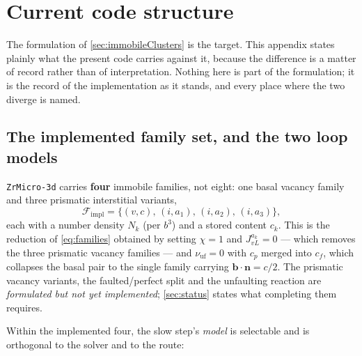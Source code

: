 \documentclass{article}
\newcommand{\ZrM}{\texttt{ZrMicro-3d}}
\newcommand{\bvec}{\bm b}
\newcommand{\nvec}{\bm n}
\begin{document}
\section{Current code structure}
\label{sec:zr3d}

The formulation of \cref{sec:immobileClusters} is the target. This appendix
states plainly what the present code carries against it, because the difference
is a matter of record rather than of interpretation. Nothing here is part of the
formulation; it is the record of the implementation as it stands, and every
place where the two diverge is named.

\subsection{The implemented family set, and the two loop models}
\label{sec:implemented}

\ZrM{} carries \textbf{four} immobile families, not eight: one basal vacancy
family and three prismatic interstitial variants,
\begin{equation}
  \mathcal F_{\mathrm{impl}}=\{(v,c),\,(i,a_1),\,(i,a_2),\,(i,a_3)\},
  \label{eq:impl-families}
\end{equation}
each with a number density $N_k$ (per $b^3$) and a stored content $c_k$. This is
the reduction of \cref{eq:families} obtained by setting $\chi=1$ and
$J^{a_k}_{vL}=0$ --- which removes the three prismatic vacancy families --- and
$\nu_{\mathrm{uf}}=0$ with $c_p$ merged into $c_f$, which collapses the basal
pair to the single family carrying $\bvec\!\cdot\!\nvec=c/2$. The prismatic
vacancy variants, the faulted/perfect split and the unfaulting reaction are
\emph{formulated but not yet implemented}; \cref{sec:status} states what
completing them requires.

Within the implemented four, the slow step's \emph{model} is selectable and is
orthogonal to the solver and to the route:
\end{document}
